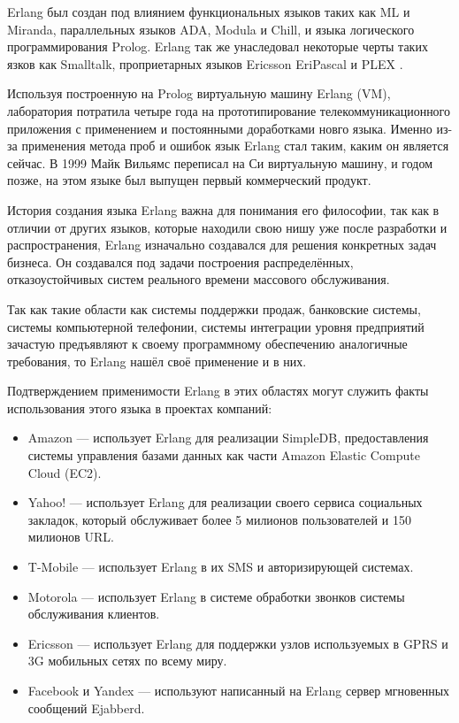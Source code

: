 \begin{par}
Erlang был создан под влиянием функциональных языков таких как  ML и Miranda, параллельных языков ADA, Modula и Chill, и языка логического программирования Prolog. Erlang так же унаследовал некоторые черты таких язков как Smalltalk, проприетарных языков Ericsson EriPascal и PLEX \cite{erlang}.
\end{par}

\begin{par}
Используя построенную на Prolog виртуальную машину Erlang (VM), лаборатория потратила  четыре года на
прототипирование телекоммуникационного приложения с применением и постоянными доработками новго языка.
Именно из-за применения метода проб и ошибок язык Erlang стал таким, каким он является сейчас. В 1999
Майк Вильямс переписал на Си виртуальную машину, и годом позже, на этом языке был выпущен первый
коммерческий продукт. 
\end{par}

\begin{par}
История создания языка Erlang важна для понимания его философии, так как в отличии от других языков, которые находили свою нишу уже после разработки и распространения, Erlang изначально создавался для решения конкретных задач бизнеса. Он создавался под задачи построения распределённых, отказоустойчивых систем реального времени массового обслуживания.
\end{par}

\begin{par}
Так как такие области как системы поддержки продаж, банковские системы, системы компьютерной телефонии, системы интеграции уровня предприятий зачастую предъявляют к своему программному обеспечению аналогичные требования, то Erlang нашёл своё применение и в них.
\end{par}

Подтверждением применимости Erlang в этих областях могут служить факты использования этого языка в
проектах компаний:
\begin{itemize}
	\item{} Amazon --- использует Erlang для реализации SimpleDB, предоставления системы
        управления базами данных как части Amazon Elastic Compute Cloud (EC2).
	\item{} Yahoo! --- использует Erlang для реализации своего сервиса социальных закладок,
    который обслуживает более 5 милионов пользователей и 150 милионов URL.
	\item{} T-Mobile --- использует Erlang в их SMS и авторизирующей системах.
	\item{} Motorola --- использует Erlang в системе обработки звонков системы обслуживания клиентов.
	\item{} Ericsson --- использует Erlang для поддержки узлов используемых в GPRS и 3G
    мобильных сетях по всему миру.
	\item{} Facebook и Yandex --- используют написанный на Erlang сервер мгновенных
    сообщений Ejabberd.
\end{itemize}

